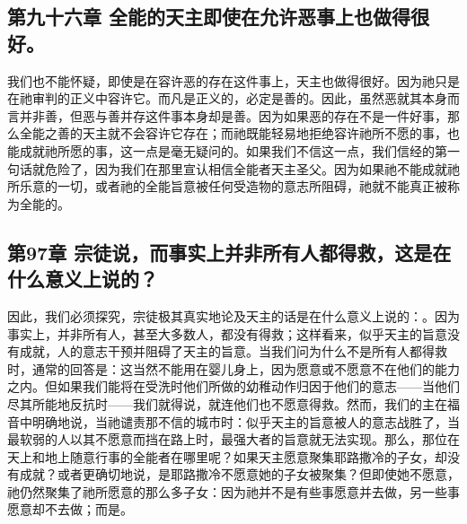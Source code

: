 
\subsection{第九十六章 全能的天主即使在允许恶事上也做得很好。}

我们也不能怀疑，即使是在容许恶的存在这件事上，天主也做得很好。因为祂只是在祂审判的正义中容许它。而凡是正义的，必定是善的。因此，虽然恶就其本身而言并非善，但恶与善并存这件事本身却是善。因为如果恶的存在不是一件好事，那么全能之善的天主就不会容许它存在；而祂既能轻易地拒绝容许祂所不愿的事，也能成就祂所愿的事，这一点是毫无疑问的。如果我们不信这一点，我们信经的第一句话就危险了，因为我们在那里宣认相信全能者天主圣父。因为如果祂不能成就祂所乐意的一切，或者祂的全能旨意被任何受造物的意志所阻碍，祂就不能真正被称为全能的。\par


\subsection{第97章 宗徒说，而事实上并非所有人都得救，这是在什么意义上说的？}

因此，我们必须探究，宗徒极其真实地论及天主的话是在什么意义上说的：。因为事实上，并非所有人，甚至大多数人，都没有得救；这样看来，似乎天主的旨意没有成就，人的意志干预并阻碍了天主的旨意。当我们问为什么不是所有人都得救时，通常的回答是：这当然不能用在婴儿身上，因为愿意或不愿意不在他们的能力之内。但如果我们能将在受洗时他们所做的幼稚动作归因于他们的意志——当他们尽其所能地反抗时——我们就得说，就连他们也不愿意得救。然而，我们的主在福音中明确地说，当祂谴责那不信的城市时：似乎天主的旨意被人的意志战胜了，当最软弱的人以其不愿意而挡在路上时，最强大者的旨意就无法实现。那么，那位在天上和地上随意行事的全能者在哪里呢？如果天主愿意聚集耶路撒冷的子女，却没有成就？或者更确切地说，是耶路撒冷不愿意她的子女被聚集？但即使她不愿意，祂仍然聚集了祂所愿意的那么多子女：因为祂并不是有些事愿意并去做，另一些事愿意却不去做；而是。\par


